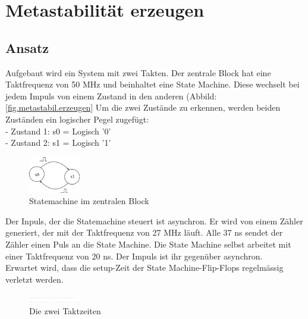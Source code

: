 \section{Metastabilität erzeugen}\label{sect.meatastabil_erzeugen}
\subsection{Ansatz}\label{sect.metastabil_ansatz}
Aufgebaut wird ein System mit zwei Takten. Der zentrale Block hat eine Taktfrequenz von 50 MHz und beinhaltet eine State Machine. Diese wechselt bei jedem Impuls von einem Zustand in den anderen (Abbild: \ref{fig.metastabil.erzeugen} Um die zwei Zustände zu erkennen, werden beiden Zuständen ein logischer Pegel zugefügt:\\
\newline
- Zustand 1:  s0  = Logisch '0'\\
- Zustand 2:  s1  = Logisch '1'\\

\begin{figure}[H]
	\centering
	\includegraphics[width=0.2\textwidth]{images/metastability/statemachine_s0_s1.png}
	\caption{Statemachine im zentralen Block}
	\label{fig.metastabil.fsm}
\end{figure}

Der Inpuls, der die Statemachine steuert ist asynchron. Er wird von einem Zähler generiert, der mit der Taktfrequenz von 27 MHz läuft. Alle 37 ns sendet der Zähler einen Puls an die State Machine. Die State Machine selbst arbeitet mit einer Taktfrequenz von 20 ns. Der Impuls ist ihr gegenüber asynchron.\\
\newline
Erwartet wird, dass die setup-Zeit der State Machine-Flip-Flops regelmässig verletzt werden. \\

\begin{figure}[H]
	\centering
	\includegraphics[width=0.2\textwidth]{images/metastability/2_takte.png}
	\caption{Die zwei Taktzeiten}
	\label{fig.metastabil.statemachine}
\end{figure}


